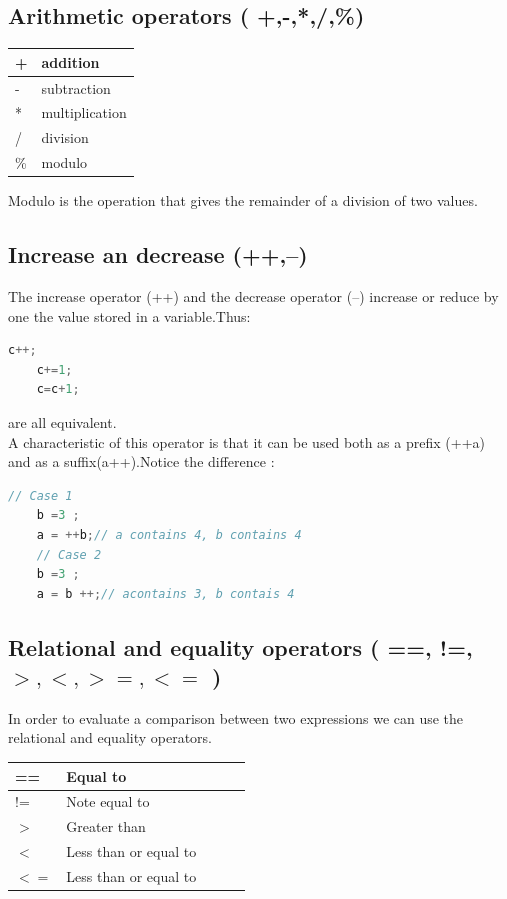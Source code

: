 \documentclass[12pt,oneside]{book}
\begin{document}
\subsection{Arithmetic operators ( +,-,*,/,\%)}
\begin{tabular}{|l|l|}
	\hline
	+  & addition       \\ \hline
	-  & subtraction   \\ \hline
	*  & multiplication \\ \hline
	/  & division       \\ \hline
	\% & modulo         \\ \hline
\end{tabular}
Modulo is the operation that gives the remainder of a division of two values.
\subsection{Increase an decrease (++,--)}
The increase operator (++) and the decrease operator (--) increase or reduce by one the value stored in a variable.Thus:
\begin{lstlisting}[language=C++]
    c++;
    c+=1;
    c=c+1;
\end{lstlisting}
are all equivalent.\\
A characteristic of this operator is that it can be used both as a prefix (++a) and as a suffix(a++).Notice the difference :
\begin{lstlisting}[language=C++]
    // Case 1
    b =3 ;
    a = ++b;// a contains 4, b contains 4
    // Case 2
    b =3 ;
    a = b ++;// acontains 3, b contais 4
\end{lstlisting}
\subsection{Relational and equality operators ( ==, !=,$ >, <, >=, <=$ )}
In order to evaluate a comparison between two expressions we can use the relational and equality operators.
\begin{center}
	\begin{tabular}{|l|l|l|l|l|}
		\hline
		==   & Equal to              \\ \hline
		!=   & Note equal to         \\ \hline
		$>$  & Greater than          \\ \hline
		$<$  & Less than or equal to \\ \hline
		$<=$ & Less than or equal to \\ \hline
	\end{tabular}
\end{center}
\end{document}
